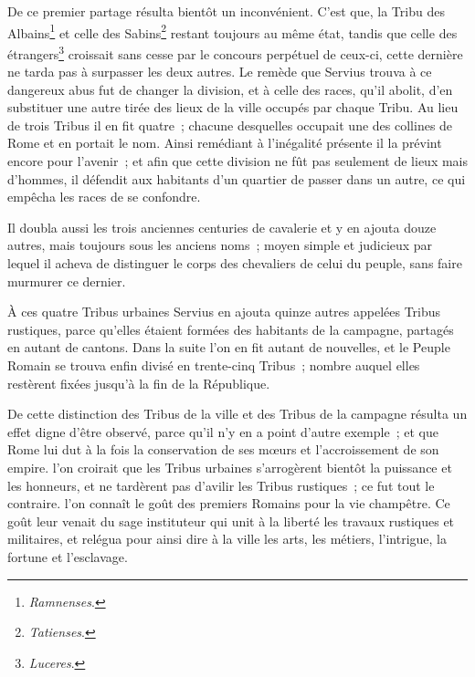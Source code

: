 \documentclass[french,twoside]{book} %
\begin{document}
De ce premier partage résulta bientôt un inconvénient. C’est que, la Tribu des Albains\footnote{{\itshape Ramnenses}.} et celle des Sabins\footnote{{\itshape Tatienses}.} restant toujours au même état, tandis que celle des étrangers\footnote{{\itshape Luceres}.} croissait sans cesse par le concours perpétuel de ceux-ci, cette dernière ne tarda pas à surpasser les deux autres. Le remède que Servius trouva à ce dangereux abus fut de changer la division, et à celle des races, qu’il abolit, d’en substituer une autre tirée des lieux de la ville occupés par chaque Tribu. Au lieu de trois Tribus il en fit quatre ; chacune desquelles occupait une des collines de Rome et en portait le nom. Ainsi remédiant à l’inégalité présente il la prévint encore pour l’avenir ; et afin que cette division ne fût pas seulement de lieux mais d’hommes, il défendit aux habitants d’un quartier de passer dans un autre, ce qui empêcha les races de se confondre.\par
Il doubla aussi les trois anciennes centuries de cavalerie et y en ajouta douze autres, mais toujours sous les anciens noms ; moyen simple et judicieux par lequel il acheva de distinguer le corps des chevaliers de celui du peuple, sans faire murmurer ce dernier.\par
À ces quatre Tribus urbaines Servius en ajouta quinze autres appelées Tribus rustiques, parce qu’elles étaient formées des habitants de la campagne, partagés en autant de cantons. Dans la suite l’on en fit autant de nouvelles, et le Peuple Romain se trouva enfin divisé en trente-cinq Tribus ; nombre auquel elles restèrent fixées jusqu’à la fin de la République.\par
De cette distinction des Tribus de la ville et des Tribus de la campagne résulta un effet digne d’être observé, parce qu’il n’y en a point d’autre exemple ; et que Rome lui dut à la fois la conservation de ses mœurs et l’accroissement de son empire. l’on croirait que les Tribus urbaines s’arrogèrent bientôt la puissance et les honneurs, et ne tardèrent pas d’avilir les Tribus rustiques ; ce fut tout le contraire. l’on connaît le goût des premiers Romains pour la vie champêtre. Ce goût leur venait du sage instituteur qui unit à la liberté les travaux rustiques et militaires, et relégua pour ainsi dire à la ville les arts, les métiers, l’intrigue, la fortune et l’esclavage.\par
\end{document}

